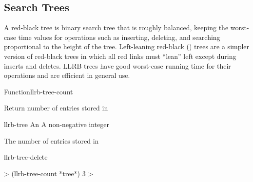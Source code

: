 \documentclass[10pt,twoside,english,pdftex]{article}
\begin{document}

\T\markright{}%
\T\pagestyle{plain}
\T\clearpage
\W{}
\T\pagestyle{fancy}
\T\thispagestyle{fancybottom}
\T\global\def\fnlastname{ }%

\subsection{Search Trees}
\label{sec:trees}%

%
%
%
A red-black tree is binary search tree that is roughly balanced, keeping the
worst-case time values for operations such as inserting, deleting, and
searching proportional to the height of the tree.  Left-leaning red-black
() trees are a simpler version of red-black trees in which all red
links must ``lean'' left except during inserts and deletes.  LLRB trees have
good worst-case running time for their operations and are efficient in general
use.

%
%

\W\entities
\T\clearpage


\begin{functiondoc}{Function}{llrb-tree-count}{
    }
%

\fnsyntax

\fnpurpose Return number of entries stored in  

\fnpackage {}

\fnmodule {}

\fnargs
\begin{args}{llrb-tree}
 An 
\arg[count] A non-negative integer
\end{args}

\fnreturns The number of entries stored in 

\begin{alsos}{llrb-tree-delete}
\end{alsos}

\fnexample
%
\W\supp
\begin{example}
  > (llrb-tree-count *tree*)
  3
  >
\end{example}

\end{functiondoc}
\end{document}
